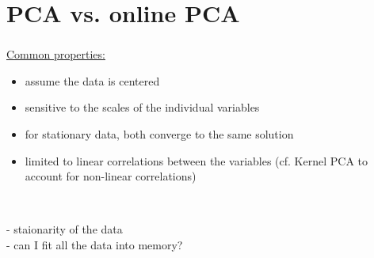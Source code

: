\begin{frame}




\end{frame}

\section{PCA vs. online PCA}

\begin{frame}\frametitle{\secname}

\underline{Common properties:}

\begin{itemize}
\item assume the data is centered
\item sensitive to the scales of the individual variables
\item for stationary data, both converge to the same solution
\item limited to linear correlations between the variables (cf. Kernel PCA to account for non-linear correlations)
\end{itemize}

\pause

\\


\pause

- staionarity of the data\\
- can I fit all the data into memory?


\end{frame}
